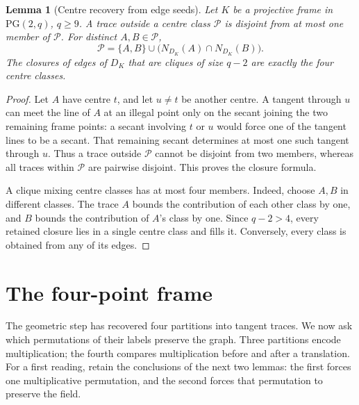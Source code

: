 \documentclass[11pt]{article}
\newtheorem{lemma}[theorem]{Lemma}
\theoremstyle{definition}
\theoremstyle{remark}
\newcommand{\PG}{\mathrm{PG}}
\begin{document}
\begin{lemma}[Centre recovery from edge seeds]\label{lem:centre-seeds}
Let $K$ be a projective frame in $\PG(2,q)$, $q\ge9$. A trace outside a
centre class $\mathcal P$ is disjoint from at most one member of
$\mathcal P$. For distinct $A,B\in\mathcal P$,
\[
 \mathcal P=\{A,B\}\cup\bigl(N_{D_K}(A)\cap N_{D_K}(B)\bigr).
\]
The closures of edges of $D_K$ that are cliques of size $q-2$ are
exactly the four centre classes.
\end{lemma}
\begin{proof}
Let $A$ have centre $t$, and let $u\ne t$ be another centre. A tangent
through $u$ can meet the line of $A$ at an illegal point only on the
secant joining the two remaining frame points: a secant involving $t$
or $u$ would force one of the tangent lines to be a secant. That
remaining secant determines at most one such tangent through $u$.
Thus a trace outside $\mathcal P$ cannot be disjoint from two members,
whereas all traces within $\mathcal P$ are pairwise disjoint. This proves
the closure formula.

A clique mixing centre classes has at most four members. Indeed, choose
$A,B$ in different classes. The trace $A$ bounds the contribution of
each other class by one, and $B$ bounds the contribution of $A$'s class
by one. Since $q-2>4$, every retained closure lies in a single centre
class and fills it. Conversely, every class is obtained from any of its edges.
\end{proof}

\section{The four-point frame}
\label{sec:frame}

The geometric step has recovered four partitions into tangent traces.
We now ask which permutations of their labels preserve the graph. Three
partitions encode
multiplication; the fourth compares multiplication before and after a
translation. For a first reading, retain the conclusions of the next two
lemmas: the first forces one multiplicative permutation, and the second
forces that permutation to preserve the field.
\end{document}
